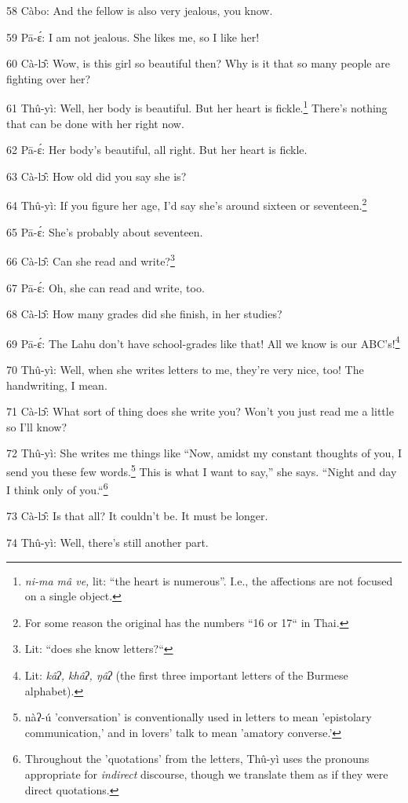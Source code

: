 58 Càbo: And the fellow is also very jealous, you know.

59 Pā-ɛ́: I am not jealous. She likes me, so I like her!

60 Cà-lɔ̂: Wow, is this girl so beautiful then? Why is it that so many people
are fighting over her?

61 Thû-yì: Well, her body is beautiful. But her heart is fickle.\footnote{\textit{ni-ma mâ ve,} lit: ``the heart is numerous''. I.e., the affections are not focused on a single object.} There's
nothing that can be done with her right now.

62 Pā-ɛ́: Her body's beautiful, all right. But her heart is fickle.

63 Cà-lɔ̂: How old did you say she is?

64 Thû-yì: If you figure her age, I'd say she's around sixteen or seventeen.\footnote{For some reason the original has the numbers ``16 or 17`` in Thai.}

65 Pā-ɛ́: She's probably about seventeen.

66 Cà-lɔ̂: Can she read and write?\footnote{Lit: ``does she know letters?``}

67 Pā-ɛ́: Oh, she can read and write, too.

68 Cà-lɔ̂: How many grades did she finish, in her studies?

69 Pā-ɛ́: The Lahu don't have school-grades like that! All we know is our ABC's!\footnote{Lit: \textit{kâʔ, khâʔ, ŋâʔ} (the first three important letters of the Burmese alphabet).}

70 Thû-yì: Well, when she writes letters to me, they're very nice, too! The handwriting,
I mean.

71 Cà-lɔ̂: What sort of thing does she write you? Won't you just read me a little
so I'll know?

72 Thû-yì: She writes me things like ``Now, amidst my constant thoughts
of you, I send you these few words.\footnote{nàʔ-ú 'conversation' is conventionally used in letters to mean 'epistolary communication,' and in lovers' talk to mean 'amatory converse.'} This is what I want to say,'' she says.
``Night and day I think only of you.``\footnote{Throughout the 'quotations' from the letters, Thû-yì uses the pronouns appropriate for\textit{ indirect }discourse, though we translate them as if they were direct quotations.}

73 Cà-lɔ̂: Is that all? It couldn't be. It must be longer.

74 Thû-yì: Well, there's still another part.

